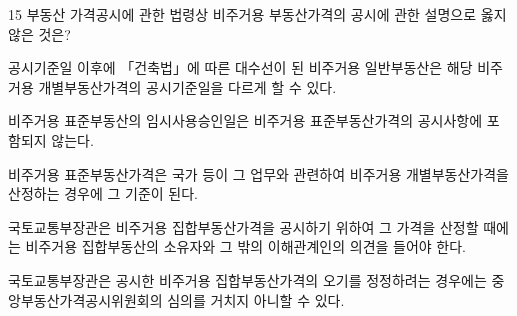 \begin{question}{15}
부동산 가격공시에 관한 법령상 비주거용 부동산가격의 공시에 관한 설명으로 옳지 않은 것은?
\begin{choices}
  \item 공시기준일 이후에 「건축법」에 따른 대수선이 된 비주거용 일반부동산은 해당 비주거용 개별부동산가격의 공시기준일을 다르게 할 수 있다.
  \item 비주거용 표준부동산의 임시사용승인일은 비주거용 표준부동산가격의 공시사항에 포함되지 않는다.
  \item 비주거용 표준부동산가격은 국가 등이 그 업무와 관련하여 비주거용 개별부동산가격을 산정하는 경우에 그 기준이 된다.
  \item 국토교통부장관은 비주거용 집합부동산가격을 공시하기 위하여 그 가격을 산정할 때에는 비주거용 집합부동산의 소유자와 그 밖의 이해관계인의 의견을 들어야 한다.
  \item 국토교통부장관은 공시한 비주거용 집합부동산가격의 오기를 정정하려는 경우에는 중앙부동산가격공시위원회의 심의를 거치지 아니할 수 있다.
\end{choices}
\end{question}
